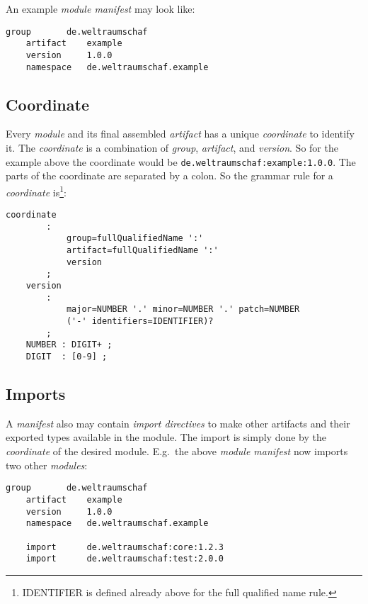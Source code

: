 \documentclass[11pt,a4paper]{report}
\begin{document}
An example \textit{module manifest} may look like:

\begin{lstlisting}[language=CayThe, title=Module.mf]
    group       de.weltraumschaf
    artifact    example
    version     1.0.0
    namespace   de.weltraumschaf.example
\end{lstlisting}

\subsection{Coordinate}

Every \textit{module} and its final assembled \textit{artifact} has a unique \textit{coordinate} to identify it. The \textit{coordinate} is a combination of \textit{group}, \textit{artifact}, and \textit{version}. So for the example above the coordinate would be \texttt{de.weltraumschaf:example:1.0.0}. The parts of the coordinate are separated by a colon. So the grammar rule for a \textit{coordinate} is\footnote{IDENTIFIER is defined already above for the full qualified name rule.}:

\begin{lstlisting}[title=Grammar for coordinate]
    coordinate
        :
            group=fullQualifiedName ':'
            artifact=fullQualifiedName ':'
            version
        ;
    version
        : 
            major=NUMBER '.' minor=NUMBER '.' patch=NUMBER
            ('-' identifiers=IDENTIFIER)?
        ;
    NUMBER : DIGIT+ ;
    DIGIT  : [0-9] ;
\end{lstlisting}

\subsection{Imports}

A \textit{manifest} also may contain \textit{import directives} to make other artifacts and their exported types available in the module. The import is simply done by the \textit{coordinate} of the desired module. E.g.\ the above \textit{module manifest} now imports two other \textit{modules}:

\begin{lstlisting}[language=CayThe, title=Module manifest with imports]
    group       de.weltraumschaf
    artifact    example
    version     1.0.0
    namespace   de.weltraumschaf.example

    import      de.weltraumschaf:core:1.2.3
    import      de.weltraumschaf:test:2.0.0
\end{lstlisting}
\end{document}
